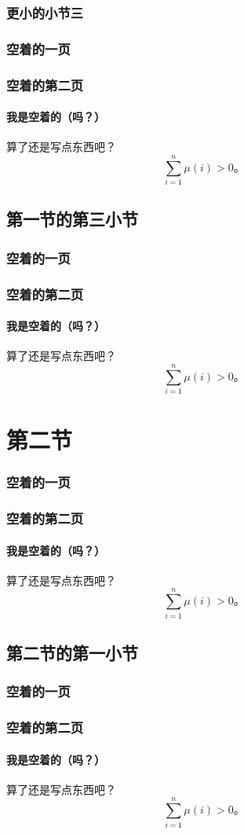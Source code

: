 \documentclass{../pkslide}
\begin{document}
\subsubsection{更小的小节三}

\begin{frame}
  \frametitle{空着的一页}
\end{frame}

\begin{frame}
  \frametitle{空着的第二页}
  \framesubtitle{我是空着的（吗？）}
  算了还是写点东西吧？
  \[ \sum_{i = 1}^{n} \mu(i) > 0 \text{。} \]
\end{frame}

\subsection{第一节的第三小节}

\begin{frame}
  \frametitle{空着的一页}
\end{frame}

\begin{frame}
  \frametitle{空着的第二页}
  \framesubtitle{我是空着的（吗？）}
  算了还是写点东西吧？
  \[ \sum_{i = 1}^{n} \mu(i) > 0 \text{。} \]
\end{frame}

\section{第二节}

\begin{frame}
  \frametitle{空着的一页}
\end{frame}

\begin{frame}
  \frametitle{空着的第二页}
  \framesubtitle{我是空着的（吗？）}
  算了还是写点东西吧？
  \[ \sum_{i = 1}^{n} \mu(i) > 0 \text{。} \]
\end{frame}

\subsection{第二节的第一小节}

\begin{frame}
  \frametitle{空着的一页}
\end{frame}

\begin{frame}
  \frametitle{空着的第二页}
  \framesubtitle{我是空着的（吗？）}
  算了还是写点东西吧？
  \[ \sum_{i = 1}^{n} \mu(i) > 0 \text{。} \]
\end{frame}
\end{document}
